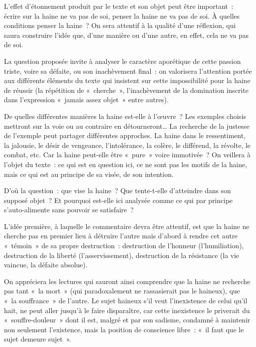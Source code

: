 {L'effet d'étonnement produit par le texte et son objet peut être important~:
écrire sur la haine ne va pas de soi, penser la haine ne va pas de soi. À quelles
conditions penser la haine~? On sera attentif à la qualité d'une réflexion, qui saura
construire l'idée que, d'une manière ou d'une autre, en effet, cela ne va pas de
soi.

La question proposée invite à analyser le caractère aporétique de cette
passion triste, voire sa défaite, ou son inachèvement final~: on valorisera
l'attention portée aux différents éléments du texte qui insistent sur cette
impossibilité pour la haine de réussir (la répétition de «~cherche~», l'inachèvement
de la domination inscrite dans l'expression «~jamais assez objet~» entre autres).

De quelles différentes manières la haine est-elle à l'œuvre~? Les exemples
choisis mettront sur la voie ou au contraire en détourneront… La recherche de la
justesse de l'exemple peut partager différentes approches. La haine dans le
ressentiment, la jalousie, le désir de vengeance, l'intolérance, la colère, le
différend, la révolte, le combat, etc. Car la haine peut-elle être «~pure~» voire
immotivée~? On veillera à l'objet du texte~: ce qui est en question ici, ce ne sont
pas les motifs de la haine, mais ce qui est au principe de sa visée, de son
intention.

D'où la question~: que vise la haine~? Que tente-t-elle d'atteindre dans son
supposé objet~? Et pourquoi est-elle ici analysée comme ce qui par principe
s'auto-alimente sans pouvoir se satisfaire~?

L'idée première, à laquelle le commentaire devra être attentif, est que la haine
ne cherche pas en premier lieu à détruire l'autre mais d'abord à rendre cet autre
«~témoin~» de sa propre destruction~: destruction de l'honneur (l'humiliation),
destruction de la liberté (l'asservissement), destruction de la résistance (la vie
vaincue, la défaite absolue).

On appréciera les lectures qui sauront ainsi comprendre que la haine ne
recherche pas tant «~la mort~» (qui paradoxalement ne rassasierait pas le
haineux), que «~la souffrance~» de l'autre. Le sujet haineux s'il veut l'inexistence
de celui qu'il hait, ne peut aller jusqu'à le faire disparaître, car cette inexistence
le priverait du «~souffre-douleur~» dont il est, malgré et par son sadisme,
condamné à maintenir non seulement l'existence, mais la position de conscience
libre~: «~il faut que le sujet demeure sujet~».

}
